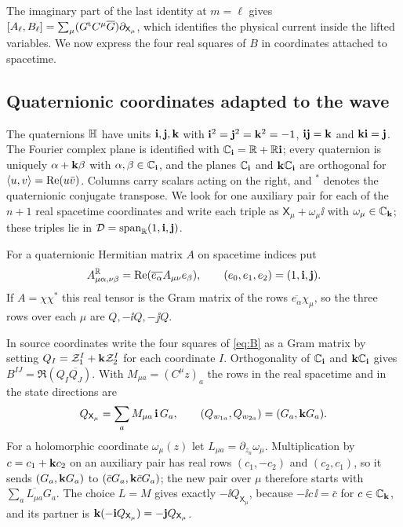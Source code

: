 The imaginary part of the last identity at $m=\ell$ gives
$[A_\ell,B_\ell]=\sum_\mu(G^{\rm t}C^\mu\overline G)\partial_{\mathsf X_\mu}$, which identifies the
physical current inside the lifted variables. We now express the four real squares of $B$ in
coordinates attached to spacetime.

\subsection{Quaternionic coordinates adapted to the wave}\label{ssec:quat}
The quaternions $\mathbb{H}$ have units $\mathbf i,\mathbf j,\mathbf k$ with $\mathbf i^2=\mathbf j^2=\mathbf k^2=-1$, $\mathbf i\mathbf j=\mathbf k$ and
$\mathbf k\mathbf i=\mathbf j$. The Fourier complex plane is identified with $\mathbb{C}_{\mathbf i}=\mathbb{R}+\mathbb{R}\mathbf i$; every quaternion is
uniquely $\alpha+\mathbf k\beta$ with $\alpha,\beta\in\mathbb{C}_{\mathbf i}$, and the planes $\mathbb{C}_{\mathbf i}$ and $\mathbf k\mathbb{C}_{\mathbf i}$ are
orthogonal for $\langle u,v\rangle=\operatorname{Re}(u\bar v)$. Columns carry scalars acting on the right, and $^*$
denotes the quaternionic conjugate transpose. We look for one auxiliary pair for each of the
$n+1$ real spacetime coordinates and write each triple as $\mathsf X_\mu+\omega_\mu\ii$ with
$\omega_\mu\in\mathbb{C}_{\mathbf k}$; these triples lie in $\mathcal D=\operatorname{span}_{\mathbb{R}}(1,\mathbf i,\mathbf j)$.

For a quaternionic Hermitian matrix $A$ on spacetime indices put
\begin{equation}\label{eq:AR}
A^{\mathbb{R}}_{\mu\alpha,\nu\beta}=\operatorname{Re}(\overline{e_\alpha}A_{\mu\nu}e_\beta),\qquad(e_0,e_1,e_2)=(1,\mathbf i,\mathbf j).
\end{equation}
If $A=\chi\chi^*$ this real tensor is the Gram matrix of the rows $\overline{e_\alpha}\chi_\mu$,
so the three rows over each $\mu$ are $Q,-\ii Q,-\jj Q$.

In source coordinates write the four squares of \eqref{eq:B} as a Gram matrix by setting
$Q_I=\mathcal Z_1^I+\mathbf k\mathcal Z_2^I$ for each coordinate $I$. Orthogonality of $\mathbb{C}_{\mathbf i}$ and
$\mathbf k\mathbb{C}_{\mathbf i}$ gives $B^{IJ}=\Re(Q_I\overline{Q_J})$. With $M_{\mu a}=(C^\mu z)_a$ the rows in the
real spacetime and in the state directions are
\[
Q_{\mathsf X_\mu}=\sum_aM_{\mu a}\,\mathbf i\, G_a,\qquad(Q_{w_{1a}},Q_{w_{2a}})=(G_a,\mathbf k G_a).
\]
For a holomorphic coordinate $\omega_\mu(z)$ let $L_{\mu a}=\partial_{z_a}\omega_\mu$.
Multiplication by $c=c_1+\mathbf k c_2$ on an auxiliary pair has real rows $(c_1,-c_2)$ and $(c_2,c_1)$,
so it sends $(G_a,\mathbf k G_a)$ to $(\bar cG_a,\mathbf k\bar cG_a)$; the new pair over $\mu$ therefore
starts with $\sum_a\overline{L_{\mu a}}G_a$. The choice $L=M$ gives exactly $-\ii Q_{\mathsf X_\mu}$,
because $-\ii c\,\ii=\bar c$ for $c\in\mathbb{C}_{\mathbf k}$, and its partner is $\mathbf k(-\mathbf i Q_{\mathsf X_\mu})=-\mathbf j Q_{\mathsf X_\mu}$.

